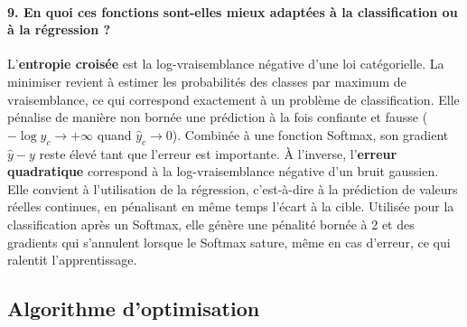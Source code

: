 \documentclass{report}
\begin{document}
\paragraph{9. En quoi ces fonctions sont-elles mieux adaptées à la classification ou à la régression ?}
L'\textbf{entropie croisée} est la log-vraisemblance négative d'une loi catégorielle. La minimiser revient à estimer les probabilités des classes par maximum de vraisemblance, ce qui correspond exactement à un problème de classification. Elle pénalise de manière non bornée une prédiction à la fois confiante et fausse ($-\log \hat{y}_c \to +\infty$ quand $\hat{y}_c \to 0$). Combinée à une fonction Softmax, son gradient $\hat{y} - y$ reste élevé tant que l'erreur est importante. À l'inverse, l'\textbf{erreur quadratique} correspond à la log-vraisemblance négative d'un bruit gaussien. Elle convient à l'utilisation de la régression, c'est-à-dire à la prédiction de valeurs réelles continues, en pénalisant en même temps l'écart à la cible. Utilisée pour la classification après un Softmax, elle génère une pénalité bornée à 2 et des gradients qui s'annulent lorsque le Softmax sature, même en cas d'erreur, ce qui ralentit l'apprentissage.

\subsection{Algorithme d'optimisation}
\end{document}
